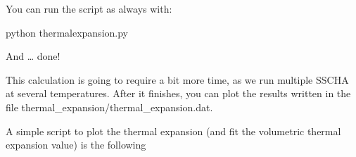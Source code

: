 \documentclass[a4paper,11pt,english]{sphinxmanual}
\begin{document}
\begin{sphinxVerbatim}[commandchars=\\\{\}]

      

     
               \PYG{p}{[} \PYG{p}{]}
                 
\end{sphinxVerbatim}

\sphinxAtStartPar
You can run the script as always with:

\begin{sphinxVerbatim}[commandchars=\\\{\}]
\PYGZdl{} python thermal\PYGZus{}expansion.py
\end{sphinxVerbatim}

\sphinxAtStartPar
And … done!

\sphinxAtStartPar
This calculation is going to require a bit more time, as we run multiple SSCHA at several temperatures.
After it finishes, you can plot the results written in the file thermal\_expansion/thermal\_expansion.dat.

\sphinxAtStartPar
A simple script to plot the thermal expansion (and fit the volumetric thermal expansion value) is the following
\end{document}
